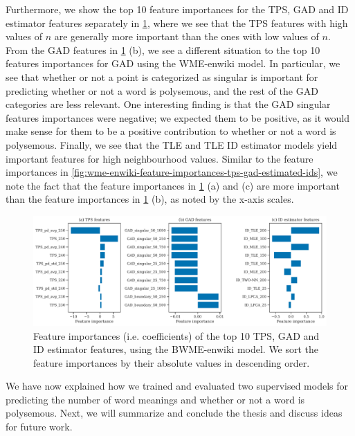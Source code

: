 Furthermore, we show the top 10 feature importances for the TPS, GAD and ID estimator features separately in \cref{fig:bwme-enwiki-feature-importances-tps-gad-estimated-ids}, where we see that the TPS features with high values of $n$ are generally more important than the ones with low values of $n$. From the GAD features in \cref{fig:bwme-enwiki-feature-importances-tps-gad-estimated-ids} (b), we see a different situation to the top 10 features importances for GAD using the WME-enwiki model. In particular, we see that whether or not a point is categorized as singular is important for predicting whether or not a word is polysemous, and the rest of the GAD categories are less relevant. One interesting finding is that the GAD singular features importances were negative; we expected them to be positive, as it would make sense for them to be a positive contribution to whether or not a word is polysemous. Finally, we see that the TLE and TLE ID estimator models yield important features for high neighbourhood values. Similar to the feature importances in \cref{fig:wme-enwiki-feature-importances-tps-gad-estimated-ids}, we note the fact that the feature importances in \cref{fig:bwme-enwiki-feature-importances-tps-gad-estimated-ids} (a) and (c) are more important than the feature importances in \cref{fig:bwme-enwiki-feature-importances-tps-gad-estimated-ids} (b), as noted by the x-axis scales.
\begin{figure}[H]
    \centering
    \includegraphics[width=\textwidth]{thesis/figures/bwme-enwiki-top-10-feature-importances-tps-gad-estimated-ids.pdf}
    \caption{Feature importances (i.e. coefficients) of the top 10 TPS, GAD and ID estimator features, using the BWME-enwiki model. We sort the feature importances by their absolute values in descending order.}
    \label{fig:bwme-enwiki-feature-importances-tps-gad-estimated-ids}
\end{figure}

We have now explained how we trained and evaluated two supervised models for predicting the number of word meanings and whether or not a word is polysemous. Next, we will summarize and conclude the thesis and discuss ideas for future work.